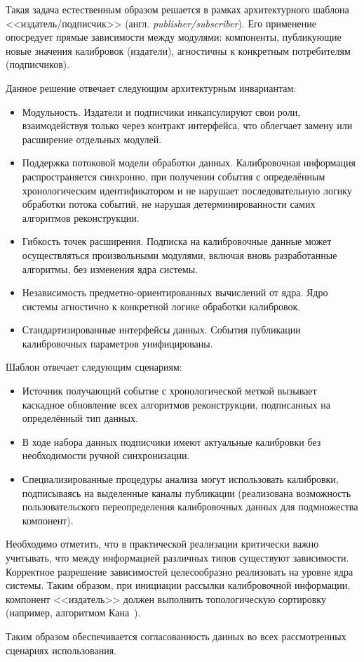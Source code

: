 Такая задача естественным образом решается в рамках архитектурного
шаблона <<издатель/подписчик>> (англ. \emph{publisher/subscriber}).
Его применение опосредует прямые зависимости между
модулями: компоненты, публикующие новые значения калибровок
(издатели), агностичны к конкретным потребителям (подписчиков).

Данное решение отвечает следующим архитектурным инвариантам:
\begin{itemize}
    \item Модульность. Издатели и подписчики инкапсулируют свои роли,
    взаимодействуя только через контракт интерфейса, что облегчает
    замену или расширение отдельных модулей.
    \item Поддержка потоковой модели обработки данных.
    Калибровочная информация распространяется синхронно, при получении
    события с определённым хронологическим идентификатором и
    не нарушает последовательную логику обработки потока
    событий, не нарушая детерминированности самих алгоритмов
    реконструкции.
    \item Гибкость точек расширения. Подписка на калибровочные
    данные может осуществляться произвольными модулями, включая
    вновь разработанные алгоритмы, без изменения ядра системы.
    \item Независимость предметно-ориентированных вычислений от
    ядра. Ядро системы агностично к конкретной логике обработки
    калибровок.
    \item Стандартизированные интерфейсы данных. События публикации
    калибровочных параметров унифицированы.
\end{itemize}

Шаблон отвечает следующим сценариям:
\begin{itemize}
    \item Источник получающий событие с хронологической меткой
    вызывает каскадное обновление всех алгоритмов реконструкции,
    подписанных на определённый тип данных.
    \item В ходе набора данных подписчики имеют актуальные
    калибровки без необходимости ручной синхронизации.
    \item Специализированные процедуры анализа могут использовать
    калибровки, подписываясь на выделенные каналы
    публикации (реализована возможность пользовательского
    переопределения калибровочных данных для подмножества компонент).
\end{itemize}

Необходимо отметить, что в практической реализации критически важно
учитывать, что между информацией различных типов существуют
зависимости. Корректное разрешение зависимостей целесообразно
реализовать на уровне ядра системы. Таким образом, при инициации
рассылки калибровочной информации, компонент <<издатель>> должен
выполнить топологическую сортировку (например, алгоритмом
Кана~\cite{kahn-tsort}).

Таким образом обеспечивается согласованность данных во всех
рассмотренных сценариях использования.
